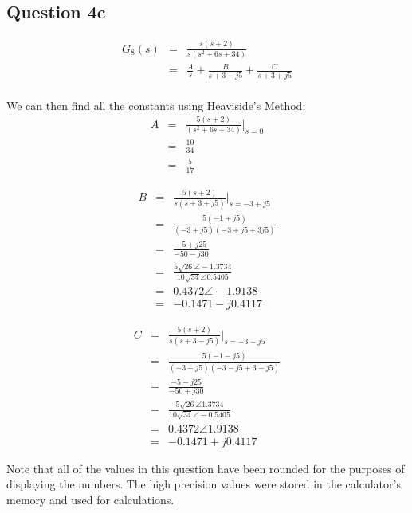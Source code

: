 \documentclass[12pt, a4paper]{article}
\begin{document}
	\subsection*{Question 4c}
	\label{sub:question_4c}
		\begin{equation*}
			\begin{array}{rcl}
				G_8 (s) & = & \frac{s(s+2)}{s(s^2+6s+34)} \\
				& = & \frac{A}{s}+\frac{B}{s+3-j5} + \frac{C}{s+3+j5} \\ 
			\end{array}
		\end{equation*}

		\noindent We can then find all the constants using Heaviside's Method:
		\begin{equation*}
			\begin{array}{rcl}
				A  & = & \frac{5(s+2)}{(s^2+6s+34)}\bigg\rvert_{s=0}\\
				& = & \frac{10}{34} \\
				& = & \frac{5}{17} 
			\end{array}
		\end{equation*}
		
		\[
			\begin{array}{rcl}
				B & = & \frac{5(s+2)}{s(s+3+j5)}\bigg\rvert_{s=-3+j5} \\
				& = & \frac{5(-1+j5)}{(-3+j5)(-3+j5+3j5)} \\
				& = & \frac{-5+j25}{-50-j30} \\
				& = & \frac{5\sqrt{26} \angle -1.3734}{10\sqrt{34} \angle 0.5405} \\
				& = & 0.4372 \angle -1.9138 \\
				& = & -0.1471 - j0.4117
			\end{array}
		\]
		
		\[
			\begin{array}{rcl}
				C & = & \frac{5(s+2)}{s(s+3-j5)}\bigg\rvert_{s=-3-j5} \\
				& = & \frac{5(-1-j5)}{(-3-j5)(-3-j5+3-j5)} \\
				& = & \frac{-5-j25}{-50+j30} \\
				& = & \frac{5\sqrt{26} \angle 1.3734}{10\sqrt{34} \angle -0.5405} \\
				& = & 0.4372 \angle 1.9138 \\
				& = & -0.1471 + j0.4117
			\end{array}
		\]

		\noindent Note that all of the values in this question have been rounded for the purposes of displaying the numbers. The high precision values were stored in the calculator's memory and used for calculations.
\end{document}
